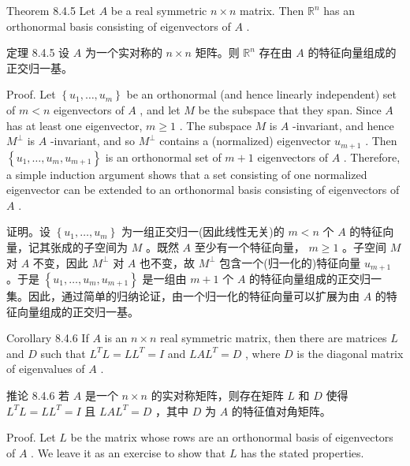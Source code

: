 \documentclass[10pt]{article}
\begin{document}
Theorem 8.4.5 Let \(A\) be a real symmetric \(n \times  n\) matrix. Then \({\mathbb{R}}^{n}\) has an orthonormal basis consisting of eigenvectors of \(A\) .

\begin{tcolorbox}\relax
定理 8.4.5 设 \(A\) 为一个实对称的 \(n \times  n\) 矩阵。则 \({\mathbb{R}}^{n}\) 存在由 \(A\) 的特征向量组成的正交归一基。
\end{tcolorbox}

Proof. Let \(\left\{  {{u}_{1},\ldots ,{u}_{m}}\right\}\) be an orthonormal (and hence linearly independent) set of \(m < n\) eigenvectors of \(A\) , and let \(M\) be the subspace that they span. Since \(A\) has at least one eigenvector, \(m \geq  1\) . The subspace \(M\) is \(A\) -invariant, and hence \({M}^{ \bot  }\) is \(A\) -invariant, and so \({M}^{ \bot  }\) contains a (normalized) eigenvector \({u}_{m + 1}\) . Then \(\left\{  {{u}_{1},\ldots ,{u}_{m},{u}_{m + 1}}\right\}\) is an orthonormal set of \(m + 1\) eigenvectors of \(A\) . Therefore, a simple induction argument shows that a set consisting of one normalized eigenvector can be extended to an orthonormal basis consisting of eigenvectors of \(A\) .

\begin{tcolorbox}\relax
证明。设 \(\left\{  {{u}_{1},\ldots ,{u}_{m}}\right\}\) 为一组正交归一(因此线性无关)的 \(m < n\) 个 \(A\) 的特征向量，记其张成的子空间为 \(M\) 。既然 \(A\) 至少有一个特征向量， \(m \geq  1\) 。子空间 \(M\) 对 \(A\) 不变，因此 \({M}^{ \bot  }\) 对 \(A\) 也不变，故 \({M}^{ \bot  }\) 包含一个(归一化的)特征向量 \({u}_{m + 1}\) 。于是 \(\left\{  {{u}_{1},\ldots ,{u}_{m},{u}_{m + 1}}\right\}\) 是一组由 \(m + 1\) 个 \(A\) 的特征向量组成的正交归一集。因此，通过简单的归纳论证，由一个归一化的特征向量可以扩展为由 \(A\) 的特征向量组成的正交归一基。
\end{tcolorbox}

Corollary 8.4.6 If \(A\) is an \(n \times  n\) real symmetric matrix, then there are matrices \(L\) and \(D\) such that \({L}^{T}L = L{L}^{T} = I\) and \({LA}{L}^{T} = D\) , where \(D\) is the diagonal matrix of eigenvalues of \(A\) .

\begin{tcolorbox}\relax
推论 8.4.6 若 \(A\) 是一个 \(n \times  n\) 的实对称矩阵，则存在矩阵 \(L\) 和 \(D\) 使得 \({L}^{T}L = L{L}^{T} = I\) 且 \({LA}{L}^{T} = D\) ，其中 \(D\) 为 \(A\) 的特征值对角矩阵。
\end{tcolorbox}

Proof. Let \(L\) be the matrix whose rows are an orthonormal basis of eigenvectors of \(A\) . We leave it as an exercise to show that \(L\) has the stated properties.
\end{document}
